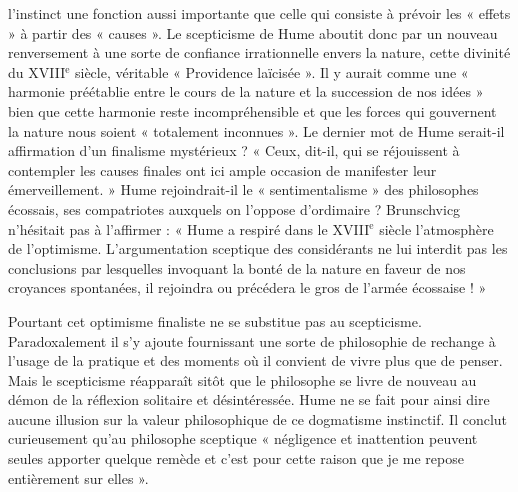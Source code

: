 l'instinct une fonction aussi importante que celle qui
consiste à prévoir les « effets » à partir des « causes ». Le
scepticisme de Hume aboutit donc par un nouveau renversement 
à une sorte de confiance irrationnelle envers la
nature, cette divinité du {\footnotesize XVIII}$^\text{e}$ siècle, 
véritable « Providence laïcisée ». Il y aurait comme une « harmonie 
préétablie entre le cours de la nature et la succession de nos
idées » bien que cette harmonie reste incompréhensible et
que les forces qui gouvernent la nature nous soient « totalement 
inconnues ». Le dernier mot de Hume serait-il
affirmation d’un finalisme mystérieux ? « Ceux, dit-il,
qui se réjouissent à contempler les causes finales ont ici
ample occasion de manifester leur émerveillement. »
Hume rejoindrait-il le « sentimentalisme » des philosophes
écossais, ses compatriotes auxquels on l’oppose d’ordimaire ? 
Brunschvicg n’hésitait pas à l’affirmer : « Hume a
respiré dans le {\footnotesize XVIII}$^\text{e}$ siècle l’atmosphère de l’optimisme.
L’argumentation sceptique des considérants ne lui interdit
pas les conclusions par lesquelles invoquant la bonté de
la nature en faveur de nos croyances spontanées, il rejoindra
ou précédera le gros de l’armée écossaise ! »

Pourtant cet optimisme finaliste ne se substitue pas au
scepticisme. Paradoxalement il s’y ajoute fournissant une
sorte de philosophie de rechange à l’usage de la pratique
et des moments où il convient de vivre plus que de penser.
Mais le scepticisme réapparaît sitôt que le philosophe se
livre de nouveau au démon de la réflexion solitaire et
désintéressée. Hume ne se fait pour ainsi dire aucune
illusion sur la valeur philosophique de ce dogmatisme
instinctif. Il conclut curieusement qu’au philosophe sceptique 
« négligence et inattention peuvent seules apporter quelque 
remède et c’est pour cette raison que je me
repose entièrement sur elles ».

